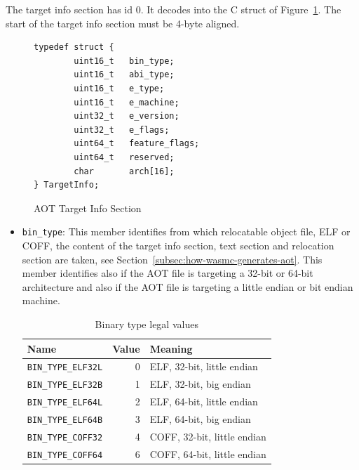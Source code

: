 \documentclass{article}
\begin{document}
The target info section has id 0. It decodes into the C struct of Figure~\ref{fig:target-info}.
The start of the target info section must be 4-byte aligned.

\begin{figure}[H]
\begin{verbatim}
typedef struct {
        uint16_t   bin_type;
        uint16_t   abi_type;
        uint16_t   e_type;
        uint16_t   e_machine;
        uint32_t   e_version;
        uint32_t   e_flags;
        uint64_t   feature_flags;
        uint64_t   reserved;
        char       arch[16];
} TargetInfo;
\end{verbatim}
\caption{AOT Target Info Section}
\label{fig:target-info}
\end{figure}

\begin{itemize}
    \item \verb|bin_type|:
        This member identifies from which relocatable object file, ELF or COFF, the content of the target info section, text section and relocation section are taken, see Section~\ref{subsec:how-wasmc-generates-aot}.
        This member identifies also if the AOT file is targeting a 32-bit or 64-bit architecture and also if the AOT file is targeting a little endian or bit endian machine.

        \begin{table}[H]
        \centering
        \begin{tabular}{lrl}
            \hline
            Name & Value & Meaning \\
            \hline
            \verb|BIN_TYPE_ELF32L| & 0 & ELF,  32-bit, little endian \\
            \verb|BIN_TYPE_ELF32B| & 1 & ELF,  32-bit, big endian \\
            \verb|BIN_TYPE_ELF64L| & 2 & ELF,  64-bit, little endian \\
            \verb|BIN_TYPE_ELF64B| & 3 & ELF,  64-bit, big endian \\
            \verb|BIN_TYPE_COFF32| & 4 & COFF, 32-bit, little endian \\
            \verb|BIN_TYPE_COFF64| & 6 & COFF, 64-bit, little endian \\
            \hline
        \end{tabular}
        \caption{Binary type legal values}
        \label{table:bin-type-legal-value}
        \end{table}



\end{itemize}
\end{document}
